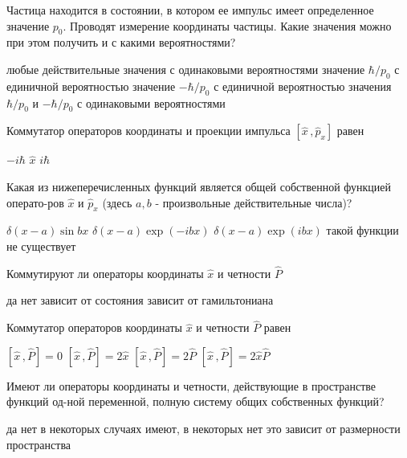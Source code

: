 \documentclass[11pt,a4paper]{exam}
\begin{document}
\begin{questions}
\question Частица находится в состоянии, в котором ее импульс имеет определенное значение ${p_0}$. Проводят измерение координаты частицы. Какие значения можно при этом получить и с какими вероятностями?
\begin{choices}
\choice любые действительные значения с одинаковыми вероятностями
\choice значение $\hbar /{p_0}$ с единичной вероятностью
\choice значение $ - \hbar /{p_0}$ с единичной вероятностью
\choice значения $\hbar /{p_0}$ и $ - \hbar /{p_0}$ с одинаковыми вероятностями
\end{choices}

\question Коммутатор операторов координаты и проекции импульса $\left[ {\hat x\,,{{\hat p}_x}} \right]$ равен
\begin{choices}
\choice $ - i\hbar $    
\choice $\hat x$     
\choice $i\hbar $    
\end{choices}

\question Какая из нижеперечисленных функций является общей собственной функцией операто-ров $\hat x$ и ${\hat p_x}$ (здесь $a,b$ - произвольные действительные числа)?
\begin{choices}
\choice $\delta (x - a)\sin bx$        
\choice $\delta (x - a)\exp ( - ibx)$
\choice $\delta (x - a)\exp (ibx)$        
\choice такой функции не существует 
\end{choices}

\question Коммутируют ли операторы координаты $\hat x$ и четности $\hat P$ 
\begin{choices}
\choice да     
\choice нет    
\choice зависит от состояния     
\choice зависит от гамильтониана
\end{choices}

\question Коммутатор операторов координаты $\hat x$ и четности $\hat P$ равен
\begin{choices}
\choice $\left[ {\hat x\,,\hat P} \right] = 0$     
\choice $\left[ {\hat x\,,\hat P} \right] = 2\hat x$     
\choice $\left[ {\hat x\,,\hat P} \right] = 2\hat P$  
\choice $\left[ {\hat x\,,\hat P} \right] = 2\hat x\hat P$
\end{choices}

\question Имеют ли операторы координаты и четности, действующие в пространстве функций од-ной переменной, полную систему общих собственных функций?
\begin{choices}
\choice да
\choice нет
\choice в некоторых случаях имеют, в некоторых нет
\choice это зависит от размерности пространства
\end{choices}


\end{questions}
\end{document}
